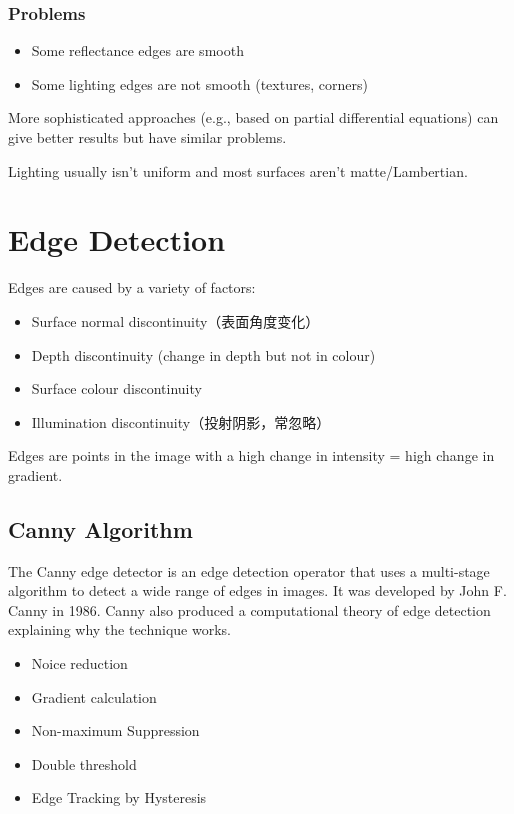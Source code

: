 \documentclass[11pt]{article}
\begin{document}
\subsubsection{Problems}
\begin{itemize}
    \item Some reflectance edges are smooth
    \item Some lighting edges are not smooth (textures, corners)
\end{itemize}
More sophisticated approaches (e.g., based on
partial differential equations) can give better
results but have similar problems.
\begin{framed}
    \begin{center}
        Lighting usually isn't uniform and most surfaces aren't matte/Lambertian.
    \end{center}
\end{framed}

\section{Edge Detection}
Edges are caused by a variety of factors:
\begin{itemize}
    \item Surface normal discontinuity（表面角度变化）
    \item Depth discontinuity (change in depth but not in colour)
    \item Surface colour discontinuity
    \item Illumination discontinuity（投射阴影，常忽略）
\end{itemize}



\begin{framed}
    \begin{center}
        Edges are points in the image with a high change in intensity = high change in gradient.
    \end{center}
\end{framed}



\subsection{Canny Algorithm}
The Canny edge detector is an edge detection operator that uses a multi-stage algorithm to detect a wide range of edges in images. It was developed by John F. Canny in 1986. Canny also produced a computational theory of edge detection explaining why the technique works.
\begin{itemize}
    \item Noice reduction
    \item Gradient calculation
    \item Non-maximum Suppression
    \item Double threshold
    \item Edge Tracking by Hysteresis
\end{itemize}
\end{document}
